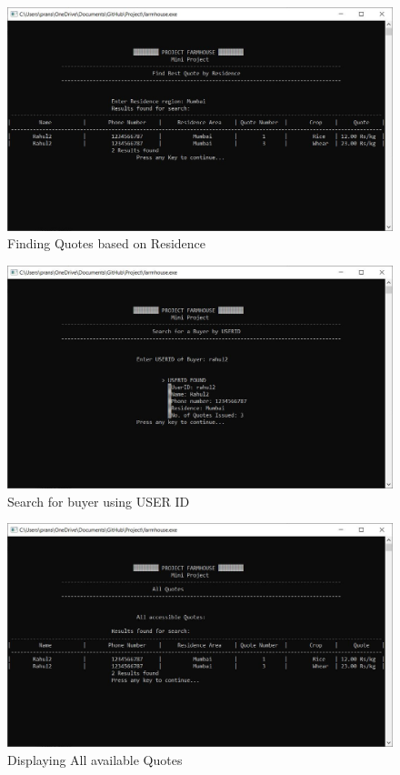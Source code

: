 \documentclass[12pt]{article}
\begin{document}
\begin{figure}[h!]
    \centering
    \includegraphics[width = \columnwidth]{ScreenShots/Buyer_6.JPG}
    \caption{Finding Quotes based on Residence}
\end{figure}

\begin{figure}[h!]
    \centering
    \includegraphics[width = \columnwidth]{ScreenShots/Farmer_5.JPG}
    \caption{Search for buyer using USER ID}
\end{figure}

\begin{figure}[h!]
    \centering
    \includegraphics[width = \columnwidth]{ScreenShots/Farmer_7.JPG}
    \caption{Displaying All available Quotes}
\end{figure}
\end{document}
